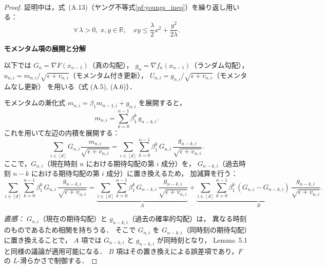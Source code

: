 \documentclass[dvipdfmx,a4paper,11pt]{jsarticle}
\begin{document}
\begin{proof}
証明中は，式~(A.13)（ヤング不等式\ref{pf:youngs_ineq}）を繰り返し用いる：
\begin{equation}
    \forall\,\lambda > 0,\; x, y \in \mathbb{R},\quad
    xy \leq \frac{\lambda}{2} x^2 + \frac{y^2}{2\lambda}.
    \tag{A.13}
    \label{eq:young}
\end{equation}

\medskip
\noindent
\textbf{モメンタム項の展開と分解}

\smallskip
\noindent
以下では $G_n = \nabla F(x_{n-1})$（真の勾配），
$g_n = \nabla f_n(x_{n-1})$（ランダム勾配），
$u_{n,i} = m_{n,i}/\sqrt{\epsilon+v_{n,i}}$（モメンタム付き更新），
$U_{n,i} = g_{n,i}/\sqrt{\epsilon+v_{n,i}}$（モメンタムなし更新）
を用いる（式 (A.5), (A.6)）．

モメンタムの漸化式 $m_{n,i} = \beta_1 m_{n-1,i} + g_{n,i}$ を展開すると，
\begin{equation}
    m_{n,i} = \sum_{k=0}^{n-1} \beta_1^k\, g_{n-k,i}.
\end{equation}
これを用いて左辺の内積を展開する：
\begin{equation}
    \sum_{i \in [d]} G_{n,i} \frac{m_{n,i}}{\sqrt{\epsilon + v_{n,i}}}
    = \sum_{i \in [d]} \sum_{k=0}^{n-1} \beta_1^k\, G_{n,i}\,
      \frac{g_{n-k,i}}{\sqrt{\epsilon + v_{n,i}}}.
    \label{eq:expand}
\end{equation}
ここで，$G_{n,i}$（現在時刻 $n$ における期待勾配の第 $i$ 成分）を，
$G_{n-k,i}$（過去時刻 $n-k$ における期待勾配の第 $i$ 成分）に置き換えるため，
加減算を行う：
\begin{equation}
    \sum_{i \in [d]} \sum_{k=0}^{n-1} \beta_1^k\, G_{n,i}\,
    \frac{g_{n-k,i}}{\sqrt{\epsilon + v_{n,i}}}
    = \underbrace{\sum_{i \in [d]} \sum_{k=0}^{n-1} \beta_1^k\, G_{n-k,i}\,
      \frac{g_{n-k,i}}{\sqrt{\epsilon + v_{n,i}}}}_{\displaystyle A}
    + \underbrace{\sum_{i \in [d]} \sum_{k=0}^{n-1} \beta_1^k\,
      (G_{n,i} - G_{n-k,i})\, \frac{g_{n-k,i}}{\sqrt{\epsilon + v_{n,i}}}}_{\displaystyle B}.
    \label{eq:AB_decomp}
    \tag{A.14}
\end{equation}

\noindent\textit{直感：}
$G_{n,i}$（現在の期待勾配）と $g_{n-k,i}$（過去の確率的勾配）は，
異なる時刻のものであるため相関を持ちうる．
そこで $G_{n,i}$ を $G_{n-k,i}$（同時刻の期待勾配）に置き換えることで，
$A$ 項では $G_{n-k,i}$ と $g_{n-k,i}$ が同時刻となり，
Lemma~5.1 と同様の議論が適用可能になる．
$B$ 項はその置き換えによる誤差項であり，$F$ の $L$-滑らかさで制御する．


\end{proof}
\end{document}
